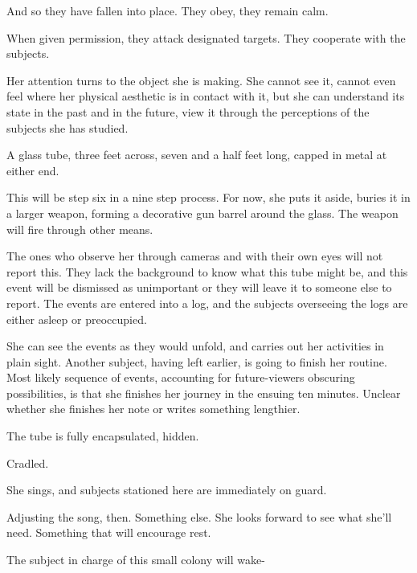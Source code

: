 And so they have fallen into place.  They obey, they remain calm.



When given permission, they attack designated targets.  They cooperate with the subjects.



Her attention turns to the object she is making.  She cannot see it, cannot even feel where her physical aesthetic is in contact with it, but she can understand its state in the past and in the future, view it through the perceptions of the subjects she has studied.



A glass tube, three feet across, seven and a half feet long, capped in metal at either end.



This will be step six in a nine step process.  For now, she puts it aside, buries it in a larger weapon, forming a decorative gun barrel around the glass.  The weapon will fire through other means.



The ones who observe her through cameras and with their own eyes will not report this.  They lack the background to know what this tube might be, and this event will be dismissed as unimportant or they will leave it to someone else to report.  The events are entered into a log, and the subjects overseeing the logs are either asleep or preoccupied.



She can see the events as they would unfold, and carries out her activities in plain sight.  Another subject, having left earlier, is going to finish her routine.  Most likely sequence of events, accounting for future-viewers obscuring possibilities, is that she finishes her journey in the ensuing ten minutes.  Unclear whether she finishes her note or writes something lengthier.



The tube is fully encapsulated, hidden.



Cradled.



She sings, and subjects stationed here are immediately on guard.



Adjusting the song, then.  Something else.  She looks forward to see what she'll need.  Something that will encourage rest.



The subject in charge of this small colony will wake-



